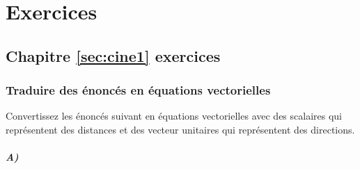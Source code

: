 \chapter{Exercices}
\label{sec:exer}

\section{Chapitre \ref{sec:cine1} exercices}

%
%
%
%
%
%
%
%
%
%



\subsection{Traduire des énoncés en équations vectorielles}
\label{sec:exerposmaison}

Convertissez les énoncés suivant en équations vectorielles avec des scalaires qui représentent des distances et des vecteur unitaires qui représentent des directions. 

\paragraph{A)} 

